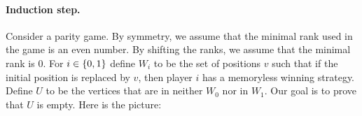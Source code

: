 %
%
%
%
%
%
%
%

\paragraph*{Induction step.}
Consider a parity game.  By symmetry, we assume that the  minimal rank used in the game is an even number. By shifting the ranks,  we assume that the minimal rank is  $0$.  For $i \in \{0,1\}$ define $W_i$ to be the set of positions $v$ such that if the initial position is replaced by $v$, then player $i$ has a memoryless winning strategy. Define $U$ to be the vertices that are in neither $W_0$ nor in $W_1$. Our goal is to prove that $U$ is empty. Here is the picture:

